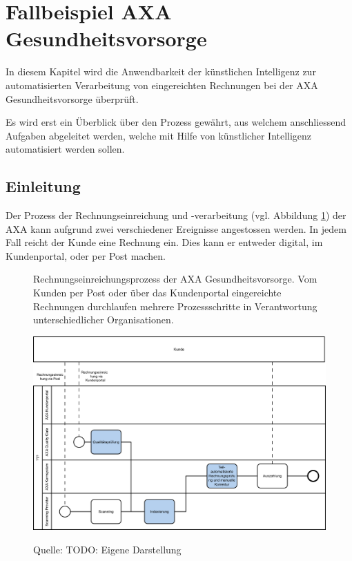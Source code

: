 \section{Fallbeispiel AXA Gesundheitsvorsorge}

In diesem Kapitel wird die Anwendbarkeit der künstlichen Intelligenz zur automatisierten Verarbeitung von eingereichten Rechnungen bei der AXA Gesundheitsvorsorge überprüft.

Es wird erst ein Überblick über den Prozess gewährt, aus welchem anschliessend Aufgaben abgeleitet werden, welche mit Hilfe von künstlicher Intelligenz automatisiert werden sollen.

\subsection{Einleitung}


Der Prozess der Rechnungseinreichung und -verarbeitung (vgl. Abbildung \ref{prozessaxa}) der AXA kann aufgrund zwei verschiedener Ereignisse angestossen werden. In jedem Fall reicht der Kunde eine Rechnung ein. Dies kann er entweder digital, im Kundenportal, oder per Post machen. 

\begin{figure}[h]
    \captionsetup{width=.8\linewidth}
    \caption{Rechnungseinreichungsprozess der AXA Gesundheitsvorsorge. Vom Kunden per Post oder über das Kundenportal eingereichte Rechnungen durchlaufen mehrere Prozessschritte in Verantwortung unterschiedlicher Organisationen.}
    \label{prozessaxa}
    \centering
    \vspace{0.2cm}
    \includegraphics[width=\textwidth]{graphics/rechnungseinreichung-bpmn.png}\\
    \vspace{0.3cm}
    \caption*{Quelle: TODO: Eigene Darstellung}
\end{figure}

